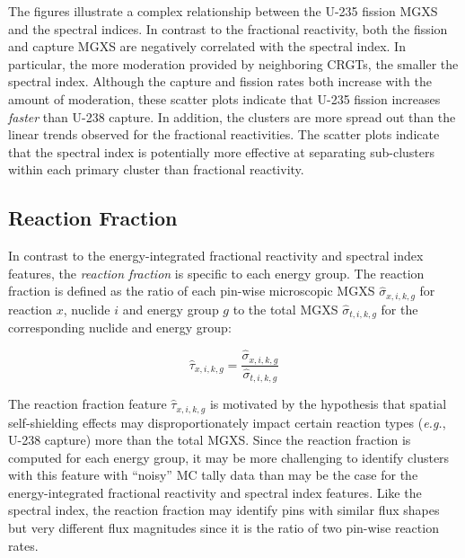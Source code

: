 
The figures illustrate a complex relationship between the U-235 fission \ac{MGXS} and the spectral indices. In contrast to the fractional reactivity, both the fission and capture \ac{MGXS} are negatively correlated with the spectral index. In particular, the more moderation provided by neighboring \acp{CRGT}, the smaller the spectral index. Although the capture and fission rates both increase with the amount of moderation, these scatter plots indicate that U-235 fission increases \textit{faster} than U-238 capture. In addition, the clusters are more spread out than the linear trends observed for the fractional reactivities. The scatter plots indicate that the spectral index is potentially more effective at separating sub-clusters within each primary cluster than fractional reactivity.



\subsection{Reaction Fraction}
\label{subsec:chap10-reaction-frac}

In contrast to the energy-integrated fractional reactivity and spectral index features, the \textit{reaction fraction} is specific to each energy group. The reaction fraction is defined as the ratio of each pin-wise microscopic \ac{MGXS} $\hat{\sigma}_{x,i,k,g}$ for reaction $x$, nuclide $i$ and energy group $g$ to the total \ac{MGXS} $\hat{\sigma}_{t,i,k,g}$ for the corresponding nuclide and energy group:

\begin{equation}
\label{eqn:chap10-reaction-frac}
\hat{\tau}_{x,i,k,g} = \frac{\hat{\sigma}_{x,i,k,g}}{\hat{\sigma}_{t,i,k,g}}
\end{equation}

The reaction fraction feature $\hat{\tau}_{x,i,k,g}$ is motivated by the hypothesis that spatial self-shielding effects may disproportionately impact certain reaction types (\textit{e.g.}, U-238 capture) more than the total \ac{MGXS}. Since the reaction fraction is computed for each energy group, it may be more challenging to identify clusters with this feature with ``noisy'' \ac{MC} tally data than may be the case for the energy-integrated fractional reactivity and spectral index features. Like the spectral index, the reaction fraction may identify pins with similar flux shapes but very different flux magnitudes since it is the ratio of two pin-wise reaction rates.


